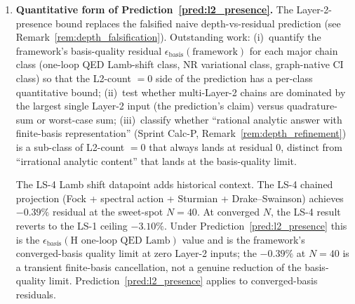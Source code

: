 \documentclass[11pt]{article}
\begin{document}
\begin{enumerate}
Are there projections in the framework that are still not yet in
this list?  Two pre-Sprint-3 candidates remain on review:
(a)~the Mellin / heat-kernel evaluation at fractional~$s$
(currently treated as part of spectral-action;\ Sprint~3 Track~12
confirmed this candidate is structurally separate from the heat-kernel
absorption verdict and remains open);
(b)~the direction-resolved Hodge decomposition of vector-photon
edges (Paper~28 \S~vq\_sprint).
Plus two open extensions surfaced by Sprint~2:
(c)~the full operator-system-level Lorentzian extension that would
deepen Wick rotation (\S~\ref{sec:proj_wick_rotation}) from
structural-correspondence to literal-identification status (see
``Operator-system-level Lorentzian extension'' below; this replaces
the previously-listed candidate-Lorentz-boost-projection entry, which
has been subsumed by the §III.27 promotion);
(d)~state-side dictionary enumeration --- mutual information,
conditional entropy, fidelity, trace distance, relative entropy
$S(\rho\|\sigma)$, Wasserstein--Kantorovich distance on $P(\mathcal{H})$
--- candidates as future §III entries on the state-side complement
opened by \S~\ref{sec:proj_apparatus_identity}.
Decision pending on (a), (b); structural progress on (c), (d) named
in their respective entries below.

\item \textbf{Quantitative form of Prediction~\ref{pred:l2_presence}.}
The Layer-2-presence bound replaces the falsified naive
depth-vs-residual prediction (see
Remark~\ref{rem:depth_falsification}).  Outstanding work:
(i)~quantify the framework's basis-quality residual
$\epsilon_\text{basis}(\text{framework})$ for each major chain
class (one-loop QED Lamb-shift class, NR variational class,
graph-native CI class) so that the L2-count $= 0$ side of the
prediction has a per-class quantitative bound; (ii)~test whether
multi-Layer-2 chains are dominated by the largest single
Layer-2 input (the prediction's claim) versus quadrature-sum or
worst-case sum; (iii)~classify whether ``rational analytic answer
with finite-basis representation'' (Sprint Calc-P,
Remark~\ref{rem:depth_refinement}) is a sub-class of L2-count $=
0$ that always lands at residual $0$, distinct from
``irrational analytic content'' that lands at the
basis-quality limit.

The LS-4 Lamb shift datapoint adds historical context.  The LS-4
chained projection (Fock + spectral action + Sturmian +
Drake--Swainson) achieves $-0.39\%$ residual at the sweet-spot
$N=40$.  At converged $N$, the LS-4 result reverts to the LS-1
ceiling $-3.10\%$.  Under
Prediction~\ref{pred:l2_presence} this is the
$\epsilon_\text{basis}(\text{H one-loop QED Lamb})$ value and is
the framework's converged-basis quality limit at zero Layer-2
inputs; the $-0.39\%$ at $N=40$ is a transient finite-basis
cancellation, not a genuine reduction of the basis-quality
limit.  Prediction~\ref{pred:l2_presence} applies to
converged-basis residuals.


\end{enumerate}
\end{document}

